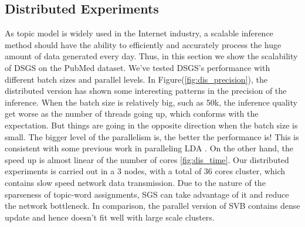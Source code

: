 \documentclass{article}
\begin{document}
\subsection{Distributed Experiments}
As topic model is widely used in the Internet industry, a scalable inference method should have the ability to efficiently and accurately process the huge amount of data generated every day. Thus, in this section we show the scalability of DSGS on the PubMed dataset. We've tested DSGS's performance with different batch sizes and parallel levels. In Figure(\ref{fig:dis_precision}), the distributed version has shown some interesting patterns in the precision of the inference. When the batch size is relatively big, such as 50k, the inference quality get worse as the number of threads going up, which conforms with the expectation. But things are going in the opposite direction when the batch size is small. The bigger level of the parallelism is, the better the performance is! This is consistent with some previous work in paralleling LDA \cite{broderick2013streaming}. On the other hand, the speed up is almost linear of the number of cores \ref{fig:dis_time}. Our distributed experiments is carried out in a 3 nodes, with a total of 36 cores cluster, which contains slow speed network data transmission. Due to the nature of the sparseness of topic-word assignments, SGS can take advantage of it and reduce the network bottleneck. In comparison, the parallel version of SVB contains dense update and hence doesn't fit well with large scale clusters.

\end{document}
